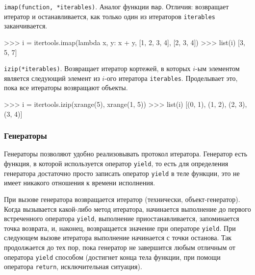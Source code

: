 \lstinline{imap(function, *iterables)}. Аналог функции \lstinline{map}. Отличия: возвращает итератор и останавливается, как только один из итераторов \lstinline{iterables} заканчивается.
\begin{pylst}{}{}
>>> i = itertools.imap(lambda x, y: x + y, [1, 2, 3, 4], [2, 3, 4])
>>> list(i)
[3, 5, 7]
\end{pylst}

\lstinline{izip(*iterables)}. Возвращает итератор кортежей, в которых $i$-ым элементом является следующий элемент из $i$-ого итератора \lstinline{iterables}. Проделывает это, пока все итераторы возвращают объекты.
\begin{pylst}{}{}
>>> i = itertools.izip(xrange(5), xrange(1, 5))
>>> list(i)
[(0, 1), (1, 2), (2, 3), (3, 4)]
\end{pylst}

\subsubsection{Генераторы}
Генераторы позволяют удобно реализовывать протокол итератора. Генератор есть функция, в которой используется оператор \lstinline{yield}, то есть для определения генератора достаточно просто записать оператор \lstinline{yield} в теле функции, это не имеет никакого отношения к времени исполнения.

При вызове генератора возвращается итератор (технически, объект-генератор). Когда вызывается какой-либо метод итератора, начинается выполнение до первого встреченного оператора \lstinline{yield}, выполнение приостанавливается, запоминается точка возврата, и, наконец, возвращается значение при операторе \lstinline{yield}. При следующем вызове итератора выполнение начинается с точки останова. Так продолжается до тех пор, пока генератор не завершится любым отличным от оператора \lstinline{yield} способом (достигнет конца тела функции, при помощи оператора \lstinline{return}, исключительная ситуация).

